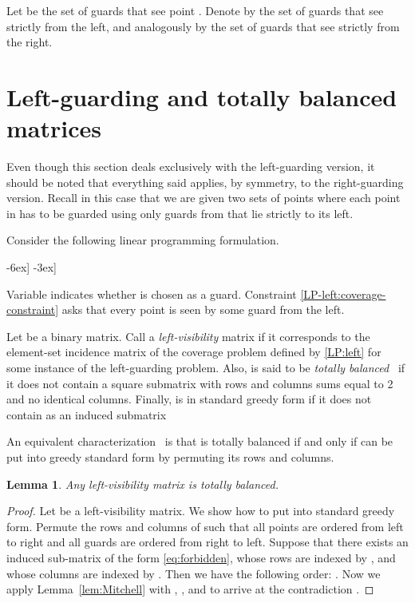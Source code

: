\documentclass[11pt]{article}
\newcommand{\qed}{\hfill\bigskip}
\newtheorem{lemma}{Lemma}
\begin{document}
Let  be the set of guards that
see point .  Denote by  the set of guards that see  strictly from
the left, and analogously by  the set of guards that see 
strictly from the right.

\section{Left-guarding and totally balanced matrices}
\label{sec:left-guarding}

Even though this section deals exclusively with the left-guarding version, it
should be noted that everything said applies, by symmetry, to the
right-guarding version. Recall in this case that we are given two sets of points  where each point in 
has to be guarded using only guards from  that lie strictly to its left.

Consider the following linear programming formulation.

-6ex] \notag
-3ex]


Variable  indicates whether  is chosen as a guard. Constraint
\eqref{LP-left:coverage-constraint} asks that every point is seen by some
guard from the left.

Let  be a binary matrix. Call  a
\emph{left-visibility} matrix if it corresponds to the element-set incidence
matrix of the coverage problem defined by \eqref{LP:left} for some instance of
the left-guarding problem. Also,  is said to be \emph{totally
  balanced}~\cite{journal/mp/Berge72} if it does not contain a square
submatrix with rows and columns sums equal to 2 and no identical columns.
Finally,  is in standard greedy form if it does not contain as an induced
submatrix


An equivalent characterization~\cite{journal/SIADM/HoffmanKS85} is that  is
totally balanced if and only if  can be put into greedy standard form by
permuting its rows and columns.

\begin{lemma} \label{lem:split}
  Any left-visibility matrix is totally balanced.
\end{lemma}

\begin{proof}
  Let  be a left-visibility matrix. We show how to put  into standard
  greedy form. Permute the rows and columns of  such that all points are
  ordered from left to right and all guards are ordered from right to
  left. Suppose that there exists an induced  sub-matrix of the
  form \eqref{eq:forbidden}, whose rows are indexed by , and
  whose columns are indexed by . Then we have the following
  order: . Now we apply Lemma~\ref{lem:Mitchell}
  with , ,  and  to arrive at the
  contradiction . \qed
\end{proof}
\end{document}
